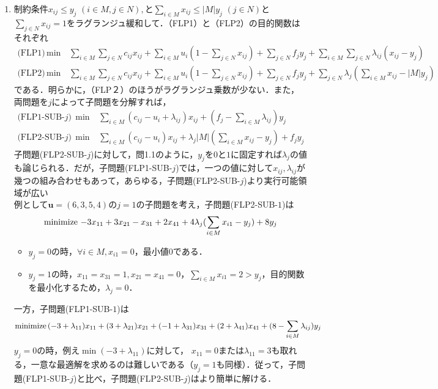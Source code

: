 \documentclass[a4paper,11pt]{jsarticle}
\numberwithin{theorem}{section}  %
\numberwithin{equation}{section} %
\newcommand{\minimize}{\mathop{\mathrm{\rm minimize}}\limits}
\begin{document}
\begin{enumerate}
\begin{itemize}
\end{itemize}
\item 制約条件$x_{ij} \le y_j \,\, (i \in M, j \in N),$と$\sum_{ i \in M} x_{ij} \le |M|y_j \,\,  (j \in N)$と$\sum_{j\in N}x_{ij} = 1$をラグランジュ緩和して．（FLP1）と（FLP2）の目的関数はそれぞれ
\[
\begin{split}
\text{(FLP1)}\,
\min &\, \sum_{i \in M} \sum_{j \in N} c_{ij}x_{ij} + \sum_{i \in M} u_i(1-\sum_{j\in N}x_{ij}) + \sum_{j \in N} f_j y_j + \sum_{i \in M} \sum_{j \in N} \lambda_{ij}(x_{ij} - y_j) \\
\text{(FLP2)}\,
\min &\,  \sum_{i \in M} \sum_{j \in N} c_{ij}x_{ij} + \sum_{i \in M} u_i(1-\sum_{j\in N}x_{ij}) + \sum_{j \in N} f_j y_j + \sum_{j \in N} \lambda_j(\sum_{i \in M} x_{ij} - |M|y_j)
\end{split}
\]
である．明らかに，（FLP２）のほうがラグランジュ乗数が少ない．また，両問題を$j$によって子問題を分解すれば，
\[
\begin{split}
\text{(FLP1-SUB-$j$)}\,
\min &\,  \sum_{i \in M}( c_{ij} - u_i + \lambda_{ij})x_{ij} +  (f_j - \sum_{i \in M} \lambda_{ij})y_j \\
\text{(FLP2-SUB-$j$)}\,
\min &\,  \sum_{i \in M}( c_{ij} - u_i )x_{ij} +  \lambda_j|M|(\sum_{i\in M} x_{ij} - y_j) +f_jy_j
\end{split}
\]
子問題(FLP2-SUB-$j$)に対して，問1.1のように，$y_j$を$0$と$1$に固定すれば$\lambda_j$の値も論じられる．だが，子問題(FLP1-SUB-$j$)では，一つの値に対して$x_{ij},\lambda_{ij}$が幾つの組み合わせもあって，あらゆる，子問題(FLP2-SUB-$j$)より実行可能領域が広い\\
例として$\bm{u}=(6,3,5,4)$の$j=1$の子問題を考え，子問題(FLP2-SUB-$1$)は
\[
\minimize \,   -3x_{11} + 3x_{21} - x_{31} + 2x_{41} +  4\lambda_j(\sum_{i\in M} x_{i1} - y_j) + 8y_j
\]
\begin{itemize}
\item $y_j=0$の時，$\forall i \in M, x_{i1}=0$，最小値$0$である．
\item $y_j=1$の時，$x_{11}=x_{31}=1,x_{21}=x_{41}=0$，$\sum_{i\in M} x_{i1} = 2 > y_j$，目的関数を最小化するため，$\lambda_j=0$．
\end{itemize}
一方，子問題(FLP1-SUB-$1$)は
\[
\minimize \,   (-3+\lambda_{11})x_{11} + (3+\lambda_{21})x_{21} + (-1+\lambda_{31})x_{31} + (2+\lambda_{41})x_{41} + (8-\sum_{i\in M} \lambda_{ij})y_j
\]
$y_j=0$の時，例え$\min(-3+\lambda_{11})$に対して， $x_{11}=0$または$\lambda_{11}=3$も取れる，一意な最適解を求めるのは難しいである（$y_j=1$も同様）．従って，子問題(FLP1-SUB-$j$)と比べ，子問題(FLP2-SUB-$j$)はより簡単に解ける．

\end{enumerate}
\end{document}
